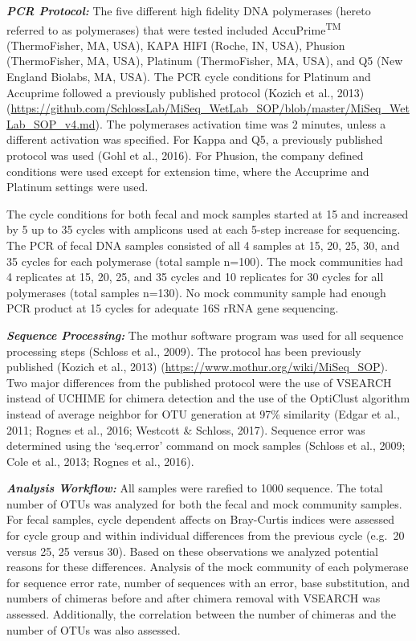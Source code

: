 \documentclass[12pt,]{article}
\begin{document}
\textbf{\emph{PCR Protocol:}} The five different high fidelity DNA
polymerases (hereto referred to as polymerases) that were tested
included AccuPrime\textsuperscript{TM} (ThermoFisher, MA, USA), KAPA
HIFI (Roche, IN, USA), Phusion (ThermoFisher, MA, USA), Platinum
(ThermoFisher, MA, USA), and Q5 (New England Biolabs, MA, USA). The PCR
cycle conditions for Platinum and Accuprime followed a previously
published protocol (Kozich et al., 2013)
(\url{https://github.com/SchlossLab/MiSeq_WetLab_SOP/blob/master/MiSeq_WetLab_SOP_v4.md}).
The polymerases activation time was 2 minutes, unless a different
activation was specified. For Kappa and Q5, a previously published
protocol was used (Gohl et al., 2016). For Phusion, the company defined
conditions were used except for extension time, where the Accuprime and
Platinum settings were used.

The cycle conditions for both fecal and mock samples started at 15 and
increased by 5 up to 35 cycles with amplicons used at each 5-step
increase for sequencing. The PCR of fecal DNA samples consisted of all 4
samples at 15, 20, 25, 30, and 35 cycles for each polymerase (total
sample n=100). The mock communities had 4 replicates at 15, 20, 25, and
35 cycles and 10 replicates for 30 cycles for all polymerases (total
samples n=130). No mock community sample had enough PCR product at 15
cycles for adequate 16S rRNA gene sequencing.

\textbf{\emph{Sequence Processing:}} The mothur software program was
used for all sequence processing steps (Schloss et al., 2009). The
protocol has been previously published (Kozich et al., 2013)
(\url{https://www.mothur.org/wiki/MiSeq_SOP}). Two major differences
from the published protocol were the use of VSEARCH instead of UCHIME
for chimera detection and the use of the OptiClust algorithm instead of
average neighbor for OTU generation at 97\% similarity (Edgar et al.,
2011; Rognes et al., 2016; Westcott \& Schloss, 2017). Sequence error
was determined using the `seq.error' command on mock samples (Schloss et
al., 2009; Cole et al., 2013; Rognes et al., 2016).

\textbf{\emph{Analysis Workflow:}} All samples were rarefied to 1000
sequence. The total number of OTUs was analyzed for both the fecal and
mock community samples. For fecal samples, cycle dependent affects on
Bray-Curtis indices were assessed for cycle group and within individual
differences from the previous cycle (e.g.~20 versus 25, 25 versus 30).
Based on these observations we analyzed potential reasons for these
differences. Analysis of the mock community of each polymerase for
sequence error rate, number of sequences with an error, base
substitution, and numbers of chimeras before and after chimera removal
with VSEARCH was assessed. Additionally, the correlation between the
number of chimeras and the number of OTUs was also assessed.
\end{document}
